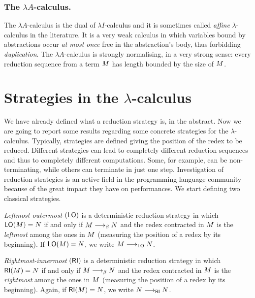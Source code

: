 \subsubsection{The $\lambda A$-calculus.}
The $\lambda A$-calculus is the dual of $\lambda I$-calculus and it is
sometimes called \emph{affine} $\lambda$-calculus in the
literature. It is a very weak calculus in which variables bound by
abstractions occur \emph{at most once} free in the abstraction's body,
thus forbidding \emph{duplication}. The $\lambda A$-calculus is strongly
normalising, in a very strong sense: every reduction sequence from a term
$M$ has length bounded by the size of $M$.
\section{Strategies in the $\lambda$-calculus}
We have already defined what a reduction strategy is, in the abstract. Now we are going to report some results regarding some concrete strategies for the $\lambda$-calculus. Typically, strategies are defined giving the position of the redex to be reduced. Different strategies can lead to completely different reduction sequences and thus to completely different computations. Some, for example, can be non-terminating, while others can terminate in just one step. Investigation of reduction strategies is an active field in the programming language community because of the great impact they have on performances. We start defining two classical strategies.
\begin{definition}
	\emph{Leftmost-outermost} $(\textsf{LO})$ is a deterministic reduction
	strategy in which $\textsf{LO}(M)=N$ if and only if
	$M\longrightarrow_\beta N$ and the redex contracted in $M$ is
	the \emph{leftmost} among the ones in $M$ (measuring the
	position of a redex by its beginning). If $\textsf{LO}(M)=N$,
	we write $M\longrightarrow_{\textsf{LO}}N$.
\end{definition}
\begin{definition}
	\emph{Rightmost-innermost} $(\textsf{RI})$ is a deterministic reduction
	strategy in which $\textsf{RI}(M)=N$ if and only if
	$M\longrightarrow_\beta N$ and the redex contracted in $M$ is
	the \emph{rightmost} among the ones in $M$ (measuring the
	position of a redex by its beginning). Again, if
	$\textsf{RI}(M)=N$, we write $N\longrightarrow_{\textsf{RI}}N$.
\end{definition}
